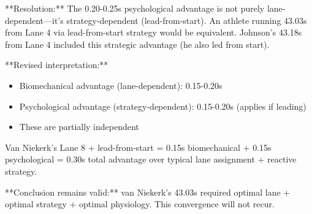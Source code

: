 **Resolution:** The 0.20-0.25s psychological advantage is not purely lane-dependent—it's strategy-dependent (lead-from-start). An athlete running 43.03s from Lane 4 via lead-from-start strategy would be equivalent. Johnson's 43.18s from Lane 4 included this strategic advantage (he also led from start).

**Revised interpretation:**
\begin{itemize}
    \item Biomechanical advantage (lane-dependent): 0.15-0.20s
    \item Psychological advantage (strategy-dependent): 0.15-0.20s (applies if leading)
    \item These are partially independent
\end{itemize}

Van Niekerk's Lane 8 + lead-from-start = 0.15s biomechanical + 0.15s psychological = 0.30s total advantage over typical lane assignment + reactive strategy.

**Conclusion remains valid:** van Niekerk's 43.03s required optimal lane + optimal strategy + optimal physiology. This convergence will not recur.
